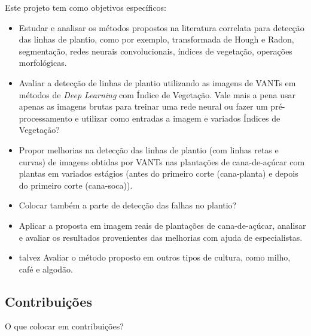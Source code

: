 \documentclass[12pt, a4paper, english, brazil]{article}
\newcommand{\textRed}[1]{{{\color{red} #1}}}
\begin{document}
Este projeto tem como objetivos específicos:
\begin{itemize}
    \item Estudar e analisar os métodos propostos na literatura correlata para detecção das linhas de plantio, como por exemplo, transformada de Hough e Radon, segmentação, redes neurais convolucionais, índices de vegetação, operações morfológicas.

    \item Avaliar a detecção de linhas de plantio utilizando as imagens de VANTs em métodos de \textit{Deep Learning} com Índice de Vegetação. Vale mais a pena usar apenas as imagens brutas para treinar uma rede neural ou fazer um pré-processamento e utilizar como entradas a imagem e variados Índices de Vegetação?

    \item Propor melhorias na detecção das linhas de plantio (com linhas retas e curvas) de imagens obtidas por VANTs nas plantações de cana-de-açúcar com plantas em variados estágios (antes do primeiro corte (cana-planta) e depois do primeiro corte (cana-soca)).

    \item \textRed{Colocar também a parte de detecção das falhas no plantio?}
    
    \item Aplicar a proposta em imagem reais de plantações de cana-de-açúcar, analisar e avaliar os resultados provenientes das melhorias com ajuda de especialistas.

    \item \textRed{talvez} Avaliar o método proposto em outros tipos de cultura, como milho, café e algodão.
\end{itemize}


\subsection{Contribuições}
    \textRed{O que colocar em contribuições?}
\end{document}
